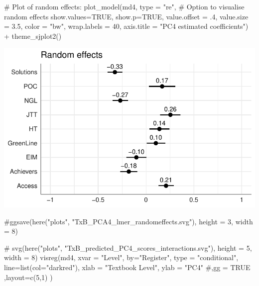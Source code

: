 \documentclass[
  letterpaper,
  DIV=11,
  numbers=noendperiod]{scrreprt}
\newenvironment{Shaded}{\begin{snugshade}}{\end{snugshade}}
\newcommand{\AttributeTok}[1]{\textcolor[rgb]{0.40,0.45,0.13}{#1}}
\newcommand{\CommentTok}[1]{\textcolor[rgb]{0.37,0.37,0.37}{#1}}
\newcommand{\ConstantTok}[1]{\textcolor[rgb]{0.56,0.35,0.01}{#1}}
\newcommand{\DecValTok}[1]{\textcolor[rgb]{0.68,0.00,0.00}{#1}}
\newcommand{\FloatTok}[1]{\textcolor[rgb]{0.68,0.00,0.00}{#1}}
\newcommand{\FunctionTok}[1]{\textcolor[rgb]{0.28,0.35,0.67}{#1}}
\newcommand{\NormalTok}[1]{\textcolor[rgb]{0.00,0.23,0.31}{#1}}
\newcommand{\SpecialCharTok}[1]{\textcolor[rgb]{0.37,0.37,0.37}{#1}}
\newcommand{\StringTok}[1]{\textcolor[rgb]{0.13,0.47,0.30}{#1}}
\begin{document}
\begin{Shaded}
\begin{Highlighting}[]
\CommentTok{\# Plot of random effects:}
\FunctionTok{plot\_model}\NormalTok{(md4, }
           \AttributeTok{type =} \StringTok{"re"}\NormalTok{, }\CommentTok{\# Option to visualise random effects}
           \AttributeTok{show.values=}\ConstantTok{TRUE}\NormalTok{, }
           \AttributeTok{show.p=}\ConstantTok{TRUE}\NormalTok{,}
           \AttributeTok{value.offset =}\NormalTok{ .}\DecValTok{4}\NormalTok{,}
           \AttributeTok{value.size =} \FloatTok{3.5}\NormalTok{,}
           \AttributeTok{color =} \StringTok{"bw"}\NormalTok{,}
           \AttributeTok{wrap.labels =} \DecValTok{40}\NormalTok{,}
           \AttributeTok{axis.title =} \StringTok{"PC4 estimated coefficients"}\NormalTok{) }\SpecialCharTok{+}
  \FunctionTok{theme\_sjplot2}\NormalTok{()}
\end{Highlighting}
\end{Shaded}

\includegraphics{AppendixF_files/figure-pdf/unnamed-chunk-33-1.pdf}

\begin{Shaded}
\begin{Highlighting}[]
\CommentTok{\#ggsave(here("plots", "TxB\_PCA4\_lmer\_randomeffects.svg"), height = 3, width = 8)}
\end{Highlighting}
\end{Shaded}

\begin{Shaded}
\begin{Highlighting}[]
\CommentTok{\# svg(here("plots", "TxB\_predicted\_PC4\_scores\_interactions.svg"), height = 5, width = 8)}
\FunctionTok{visreg}\NormalTok{(md4, }\AttributeTok{xvar =} \StringTok{"Level"}\NormalTok{, }\AttributeTok{by=}\StringTok{"Register"}\NormalTok{, }\AttributeTok{type =} \StringTok{"conditional"}\NormalTok{,}
       \AttributeTok{line=}\FunctionTok{list}\NormalTok{(}\AttributeTok{col=}\StringTok{"darkred"}\NormalTok{), }
       \AttributeTok{xlab =} \StringTok{"Textbook Level"}\NormalTok{, }\AttributeTok{ylab =} \StringTok{"PC4"}
       \CommentTok{\#,gg = TRUE}
\NormalTok{       ,}\AttributeTok{layout=}\FunctionTok{c}\NormalTok{(}\DecValTok{5}\NormalTok{,}\DecValTok{1}\NormalTok{)}
\NormalTok{)}
\end{Highlighting}
\end{Shaded}
\end{document}
